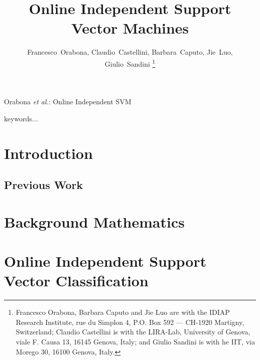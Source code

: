 \documentclass[9.5pt,journal,a4paper,twocolumn]{IEEEtran}
\begin{document}

\title{Online Independent Support Vector Machines}

\author{
Francesco~Orabona,
Claudio~Castellini,
Barbara~Caputo,
Jie~Luo,
Giulio~Sandini%
\thanks{Francesco Orabona, Barbara Caputo and Jie Luo are with the
IDIAP Research Institute, rue du Simplon 4, P.O. Box 592 --- CH-1920
Martigny, Switzerland; Claudio Castellini is with the LIRA-Lab,
University of Genova, viale F. Causa 13, 16145 Genova, Italy; and
Giulio Sandini is with he IIT, via Morego 30, 16100 Genova, Italy.}}

{Orabona \MakeLowercase{\textit{et al.}}:
Online Independent SVM}

\maketitle


\begin{abstract}
  
\end{abstract}

\begin{keywords}
keywords...
\end{keywords}

\section{Introduction}
\label{introduction}


\subsection{Previous Work}
\label{prev-work}


\section{Background Mathematics}
\label{sec:bg}


\section{Online Independent Support Vector Classification}
\label{sec:opt}

\end{document}
